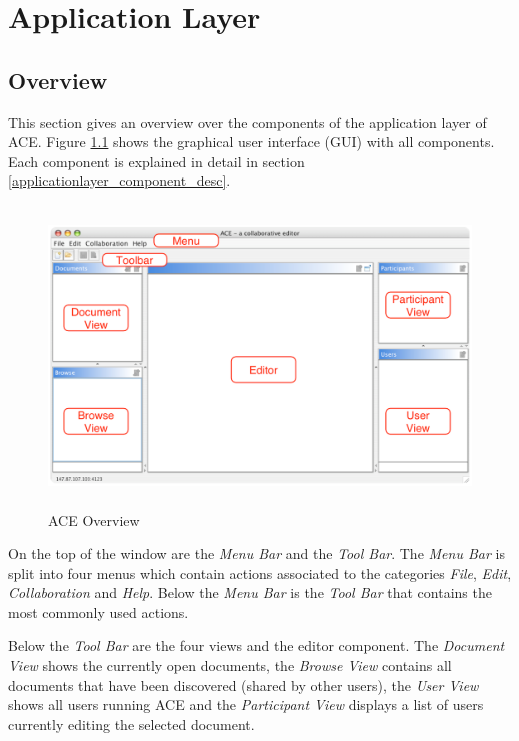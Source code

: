 \chapter{Application Layer}
\label{chapter:applicationlayer}

\section{Overview}
This section gives an overview over the components of the application layer of ACE. Figure \ref{applicationlayer_ace_overview} shows the graphical user interface (GUI) with all components. Each component is explained in detail in section \ref{applicationlayer_component_desc}.
\begin{figure}[H]
\begin{center}
  \includegraphics[height=3.135in, width=5.01in]{../images/finalreport/application_ace_overview.eps}
\caption{ACE Overview}
\label{applicationlayer_ace_overview}
\end{center}
\end{figure}
On the top of the window are the \textit{Menu Bar} and the \textit{Tool Bar}. The \textit{Menu Bar} is split into four menus which contain actions associated to the categories \textit{File}, \textit{Edit}, \textit{Collaboration} and \textit{Help}. Below the \textit{Menu Bar} is the \textit{Tool Bar} that contains the most commonly used actions.

Below the \emph{Tool Bar} are the four views and the editor component. The \textit{Document View} shows the currently open documents, the \textit{Browse View} contains all documents that have been discovered (shared by other users), the \textit{User View} shows all users running ACE and the \textit{Participant View} displays a list of users currently editing the selected document.

